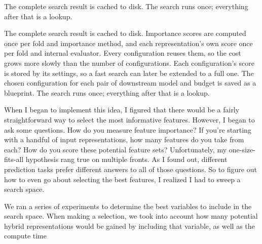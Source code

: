 
The complete search result is cached to disk. The search runs once; everything after that is a lookup.

The complete search result is cached to disk. Importance scores are computed once per fold and importance method, and each representation's own score once per fold and internal evaluator. Every configuration reuses them, so the cost grows more slowly than the number of configurations. Each configuration's score is stored by its settings, so a fast search can later be extended to a full one. The chosen configuration for each pair of downstream model and budget is saved as a blueprint. The search runs once; everything after that is a lookup.

When I began to implement this idea, I figured that there would be a fairly straightforward way to select the most informative features. However, I began to ask some questions. How do you measure feature importance? If you're starting with a handful of input representations, how many features do you take from each? How do you score these potential feature sets?  Unfortunately, my one-size-fits-all hypothesis rang true on multiple fronts. As I found out, different prediction tasks prefer different answers to all of those questions. So to figure out how to even go about selecting the best features, I realized I had to sweep a search space.

We ran a series of experiments to determine the best variables to include in the search space.
When making a selection, we took into account how many potential hybrid representations would be gained by including that variable, as well as the compute time

